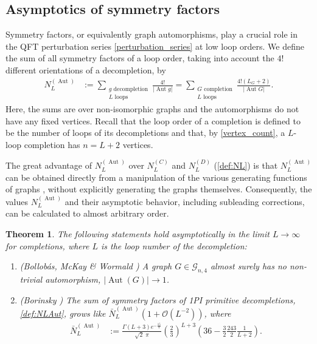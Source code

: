 \documentclass[12pt,a4paper]{article}
\newtheorem{theorem}{Theorem}
\newcommand{\abs}[1]{\lvert #1 \rvert}
\newcommand{\Aut}{\operatorname{Aut}}
\renewcommand{\|}{\rule[-0.4ex]{0.2ex}{1.2em}}
\begin{document}
\subsection{Asymptotics of symmetry factors}\label{sec:asymptotics_symmetry}





Symmetry factors, or equivalently graph automorphisms, play a crucial role in the  QFT perturbation series \cref{perturbation_series} at low loop orders. 
 We define the sum of all symmetry factors of a loop order, taking into account the $4!$ different orientations of a decompletion, by
\begin{align}\label{def:NLAut}
	N^{(\Aut)}_L &:= \sum_{\substack{g \text{ decompletion}\\{L \text{ loops}}}} \frac{4!}{\abs{\Aut g}}= \sum_{ \substack{G \text{ completion}\\  L \text{ loops}}} \frac{4! \left( L_G+2 \right)  }{\abs{\Aut G}}.
\end{align}
Here, the sums are over non-isomorphic graphs and the automorphisms do not have any fixed vertices. Recall  that the loop order of a completion is defined to be the number of loops of its decompletions   and that, by \cref{vertex_count}, a $L$-loop completion has $n=L+2$ vertices.

The great advantage of $N^{(\Aut)}_L$ over $N^{(C)}_L$ and $N^{(D)}_L$ (\cref{def:NL}) is that $N^{(\Aut)}_L$ can be obtained directly from a manipulation of the various generating functions of graphs  \cite{cvitanovic_number_1978,borinsky_renormalized_2017}, without explicitly generating the graphs themselves. Consequently, the values $N^{(\Aut)}_L$ and their asymptotic behavior, including subleading corrections, can be calculated to almost arbitrary order.


\begin{theorem}\label{thm:asymptotic_symmetry_factor}
	The following statements hold asymptotically in the limit $L\rightarrow \infty$ for completions, where $L$ is the loop number of the decompletion:
	\begin{enumerate}
		\item (Bollobás, McKay \& Wormald \cite{bollobas_asymptotic_1982,mckay_automorphisms_1984}) A graph $G\in \mathcal{G}_{n,4}$ almost surely has no non-trivial automorphism, $\abs{\Aut(G)}\rightarrow 1$.
		\item (Borinsky \cite{borinsky_renormalized_2017}) The sum of symmetry factors of  1PI primitive decompletions, \cref{def:NLAut},  grows like $\bar N^{(\Aut)}_L \left( 1+ \mathcal{O}\left( L^{-2}  \right)   \right)$, where
		\begin{align*} 
		  \bar N^{(\Aut)}_L &:=\frac{\Gamma(L+3) e^{-\frac{15}{4}}}{\sqrt 2 \; \pi} \left( \frac 2 3  \right) ^{L+3} \left( 36 - \frac 32 \frac{243}{2}\frac{1}{L+2} \right) .
		\end{align*}
	\end{enumerate}
\end{theorem}
\end{document}
